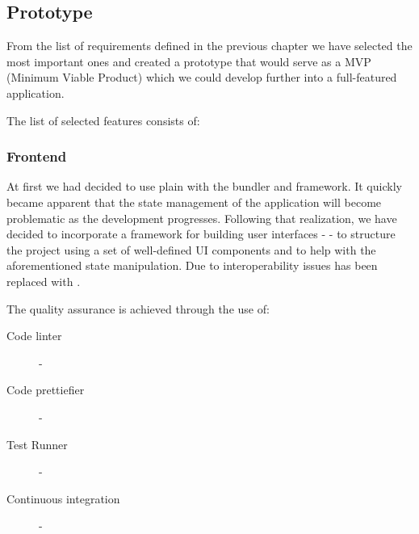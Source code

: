 \subsection{Prototype}

From the list of requirements defined in the previous chapter we have selected the most important ones and created a prototype that would serve as a MVP (Minimum Viable Product) which we could develop further into a full-featured application.
\smallskip

The list of selected features consists of: 

\begin{enumerate}
\end{enumerate}

\subsubsection{Frontend}

At first we had decided to use plain  with the  bundler and  framework.
It quickly became apparent that the state management of the application will become problematic as the development progresses.
Following that realization, we have decided to incorporate a framework for building user interfaces -  - to structure the project
using a set of well-defined UI components and to help with the aforementioned state manipulation. 
Due to interoperability issues  has been replaced with .
\smallskip

The quality assurance is achieved through the use of:

\begin{description}
	\item[Code linter] - 
	\item[Code prettiefier] - 
	\item[Test Runner] - 
	\item[Continuous integration] - 
\end{description}

